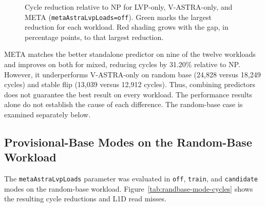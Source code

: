 \begin{figure}[H]
    \caption{Cycle reduction relative to NP for LVP-only, V-ASTRA-only,
    and META (\texttt{metaAstraLvpLoads=off}). Green marks the largest
    reduction for each workload. Red shading grows with the gap, in
    percentage points, to that largest reduction.}
    \label{tab:meta-cycle-comparison}
\end{figure}

META matches the better standalone predictor on nine of the twelve
workloads and improves on both for mixed, reducing cycles by
31.20\% relative to NP. However, it underperforms V-ASTRA-only on
random base (24,828 versus 18,249 cycles) and
stable flip (13,039 versus 12,912 cycles). Thus, combining
predictors does not guarantee the best result on every workload.
The performance results alone do not establish the cause of each
difference. The random-base case is examined separately below.

\subsection{Provisional-Base Modes on the Random-Base Workload}
\label{subsec:provisional-base-performance}

The \texttt{metaAstraLvpLoads} parameter was evaluated in
\texttt{off}, \texttt{train}, and \texttt{candidate} modes on the
random-base workload. Figure~\ref{tab:randbase-mode-cycles} shows
the resulting cycle reductions and L1D read misses.

